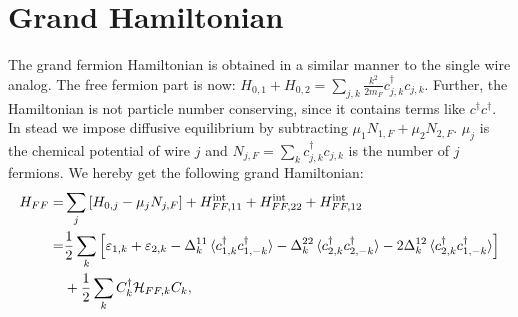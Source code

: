 \section{Grand Hamiltonian}
\label{sec.2wiresgrandHFF}
The grand fermion Hamiltonian is obtained in a similar manner to the single wire analog. The free fermion part is now: $H_{0,1}+H_{0,2} = \sum_{j,k}\frac{k^2}{2m_F}c^\dagger_{j,k}c_{j,k}$. Further, the Hamiltonian is not particle number conserving, since it contains terms like $c^\dagger c^\dagger$. In stead we impose diffusive equilibrium by subtracting $\mu_1N_{1,F}+\mu_2N_{2,F}$. $\mu_j$ is the chemical potential of wire $j$ and $N_{j,F} = \sum_k c^\dagger_{j,k}c_{j,k}$ is the number of $j$ fermions. We hereby get the following grand Hamiltonian:
\begin{align}
H_{FF} = &\sum_j \left[H_{0,j} - \mu_j N_{j,F}\right] + H^\text{int}_{FF,11} + H^\text{int}_{FF,22} + H^\text{int}_{FF,12} \nonumber \\
       = &\frac{1}{2}\sum_k\left[\varepsilon_{1,k} + \varepsilon_{2,k} - \Delta^{11}_k\braket{c^\dagger_{1,k}c^\dagger_{1,-k}} - \Delta^{22}_k\braket{c^\dagger_{2,k}c^\dagger_{2,-k}} - 2\Delta^{12}_k\braket{c^\dagger_{2,k}c^\dagger_{1,-k}} \right] \nonumber \\
       & + \frac{1}{2}\sum_k C^\dagger_k \mathcal{H}_{FF,k}C_k,
\end{align}

